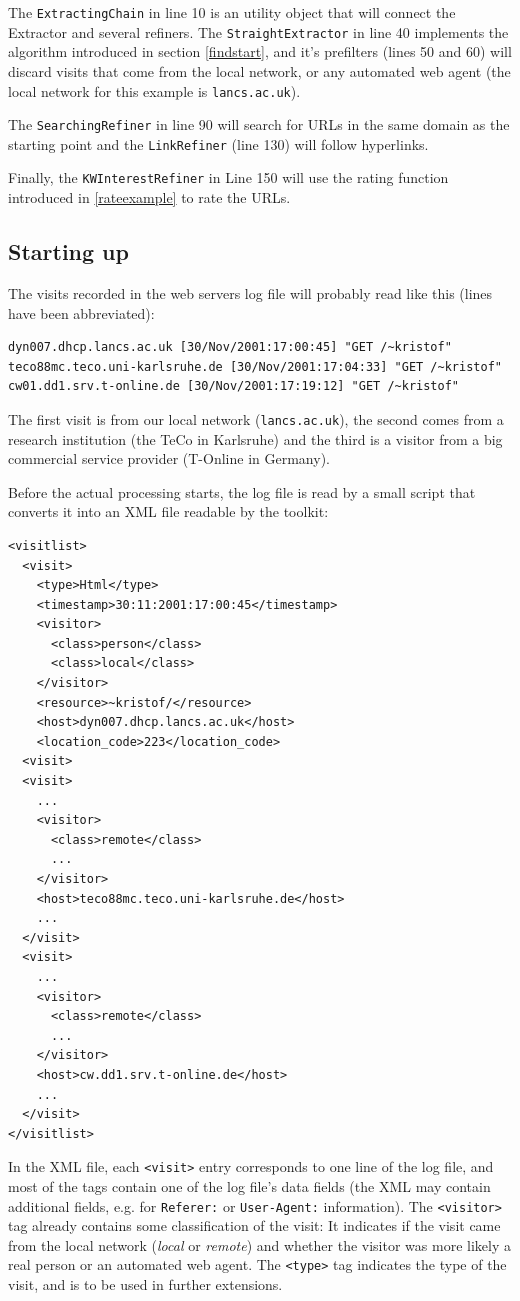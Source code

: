 \documentclass[a4paper,twoside]{danarticle}
\theoremstyle{remark}
\begin{document}
      The \verb$ExtractingChain$ in line 10 is an utility object that will 
      connect the Extractor and several refiners. The \verb$StraightExtractor$ 
      in line 40 implements the algorithm introduced in section
      \ref{findstart}, and 
      it's prefilters (lines 50 and 60) will discard visits that come from the 
      local network, or any automated web agent (the local network for this
      example is \verb$lancs.ac.uk$).
      
      The \verb$SearchingRefiner$ in line 90 will search for URLs in the same 
      domain as the starting point and the \verb$LinkRefiner$ (line 130) will 
      follow hyperlinks.
      
      Finally, the \verb$KWInterestRefiner$ in Line 150 will use the rating 
      function introduced in \ref{rateexample} to rate the URLs.
    \subsection*{Starting up}
      The visits recorded in the web servers log file will probably read
      like this (lines have been abbreviated):
      \begin{verbatim}
dyn007.dhcp.lancs.ac.uk [30/Nov/2001:17:00:45] "GET /~kristof"
teco88mc.teco.uni-karlsruhe.de [30/Nov/2001:17:04:33] "GET /~kristof"
cw01.dd1.srv.t-online.de [30/Nov/2001:17:19:12] "GET /~kristof"
      \end{verbatim}
      The first visit is from our local network (\verb$lancs.ac.uk$), the
      second comes from a research institution (the TeCo in Karlsruhe) and the
      third is a visitor from a big commercial service provider (T-Online in
      Germany).
      
      Before the actual processing starts, the log file is read by a small
      script that converts it into an XML file readable by the toolkit:
      \begin{verbatim}
<visitlist>
  <visit>
    <type>Html</type>
    <timestamp>30:11:2001:17:00:45</timestamp>
    <visitor>
      <class>person</class>
      <class>local</class>
    </visitor>
    <resource>~kristof/</resource>
    <host>dyn007.dhcp.lancs.ac.uk</host>
    <location_code>223</location_code>
  <visit>
  <visit>
    ...
    <visitor>
      <class>remote</class>
      ...
    </visitor>
    <host>teco88mc.teco.uni-karlsruhe.de</host>
    ...
  </visit>
  <visit>
    ...
    <visitor>
      <class>remote</class>
      ...
    </visitor>
    <host>cw.dd1.srv.t-online.de</host>
    ...
  </visit>
</visitlist>
      \end{verbatim}
      In the XML file, each \verb$<visit>$ entry corresponds to one line of the
      log file, and most of the tags contain one of the log file's data fields
      (the XML may contain additional fields, e.g. for \verb$Referer:$ or 
      \verb$User-Agent:$ information). The \verb$<visitor>$ tag already
      contains some classification of the visit: It indicates if the visit came
      from the local network (\textit{local} or \textit{remote}) and whether the
      visitor was more likely a real person or an automated web agent. The
      \verb$<type>$ tag indicates the type of the visit, and is to be used in
      further extensions.
\end{document}
